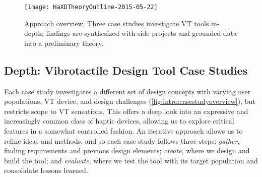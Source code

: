 \begin{figure}[htbp]
\begin{center}
\texttt{[image: HaXDTheoryOutline-2015-05-22]}
\caption{Approach overview. Three case studies investigate VT tools in-depth; findings are synthesized with side projects and grounded data into a preliminary theory.}
\label{fig:intro:methodologyoverview}
\end{center}
\end{figure}






\subsection{Depth: Vibrotactile Design Tool Case Studies}

Each case study investigates a different set of design concepts with varying user populations, VT device, and design challenges (\autoref{fig:intro:casestudyoverview}), but restricts scope to VT sensations.
This offers a deep look into an expressive and increasingly common class of haptic devices, allowing us to explore critical features in a somewhat controlled fashion.
An iterative approach allows us to refine ideas and methods, and so each case study follows three steps: \emph{gather}, finding requirements and previous design elements; \emph{create}, where we design and build the tool; and \emph{evaluate}, where we test the tool with its target population and consolidate lessons learned.

